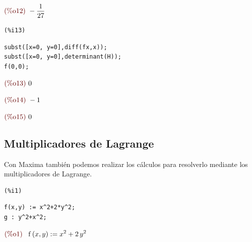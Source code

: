 \documentclass[12pt]{article}
\begin{document}
\begin{math}\displaystyle
\parbox{8ex}{\color{labelcolor}(\%o12) }
-\frac{1}{27}
\end{math}


\noindent
\begin{minipage}[t]{8ex}{\color{red}\bf
\begin{verbatim}
(%i13) 
\end{verbatim}}
\end{minipage}
\begin{minipage}[t]{\textwidth}{\color{blue}
\begin{verbatim}
subst([x=0, y=0],diff(fx,x));
subst([x=0, y=0],determinant(H));
f(0,0);
\end{verbatim}}
\end{minipage}
\begin{math}\displaystyle
\parbox{8ex}{\color{labelcolor}(\%o13) }
0
\end{math}

\begin{math}\displaystyle
\parbox{8ex}{\color{labelcolor}(\%o14) }
-1
\end{math}

\begin{math}\displaystyle
\parbox{8ex}{\color{labelcolor}(\%o15) }
0
\end{math}


\subsection{Multiplicadores de Lagrange}
Con Maxima también podemos realizar los cálculos para resolverlo mediante los multiplicadores de Lagrange.

\noindent
\begin{minipage}[t]{8ex}{\color{red}\bf
\begin{verbatim}
(%i1) 
\end{verbatim}}
\end{minipage}
\begin{minipage}[t]{\textwidth}{\color{blue}
\begin{verbatim}
f(x,y) := x^2+2*y^2;
g : y^2+x^2;
\end{verbatim}}
\end{minipage}
\begin{math}\displaystyle
\parbox{8ex}{\color{labelcolor}(\%o1) }
\mathrm{f}\left( x,y\right) :={x}^{2}+2\,{y}^{2}
\end{math}
\end{document}
